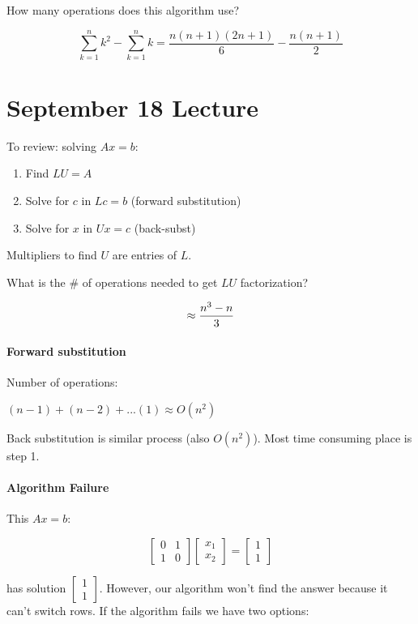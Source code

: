 \documentclass[12pt]{article}
\newcommand{\<}{\langle}
\renewcommand{\>}{\rangle}
\begin{document}
How many operations does this algorithm use?

\[
	\sum_{k=1}^n k^2 - \sum_{k=1}^n k = \frac{n(n+1)(2n+1)}{6} - \frac{n(n+1)}{2}
\]

\section{September 18 Lecture}

To review: solving $Ax=b$:
\begin{enumerate}
	\item Find $LU=A$
	\item Solve for $c$ in $Lc=b$ (forward substitution)
	\item Solve for $x$ in $Ux=c$ (back-subst)
\end{enumerate}

Multipliers to find $U$ are entries of $L$.

What is the \# of operations needed to get $LU$ factorization?

\[
	\approx {n^3 - n \over 3}
\]

\paragraph{Forward substitution} Number of operations:

$(n-1) + (n-2) + ... (1) \approx O(n^2)$

Back substitution is similar process (also $O(n^2)$). Most time consuming place is step 1.

\paragraph{Algorithm Failure} This $Ax=b$:

\[
	\begin{bmatrix}
		0 & 1 \\ 1 & 0
	\end{bmatrix}
	\begin{bmatrix}
		x_1 \\ x_2
	\end{bmatrix} = 
	\begin{bmatrix}
		1 \\ 1
	\end{bmatrix}
\]

has solution $\begin{bmatrix}
	1 \\ 1
\end{bmatrix}$. However, our algorithm won't find the answer because it can't switch rows. If the algorithm fails we have two options:
\end{document}
